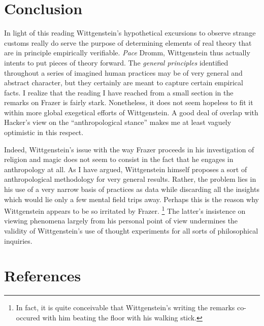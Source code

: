 \documentclass{article}
\begin{document}
\section{Conclusion}
In light of this reading Wittgenstein's hypothetical excursions to observe strange customs really do serve the purpose of determining elements of real theory that are in principle empirically verifiable. \textit{Pace} Dromm, Wittgenstein thus actually intents to put pieces of theory forward. The \textit{general principles} identified throughout a series of imagined human practices may be of very general and abstract character, but they certainly are meant to capture certain empirical facts. I realize that the reading I have reached from a small section in the remarks on Frazer is fairly stark. Nonetheless, it does not seem hopeless to fit it within more global exegetical efforts of Wittgenstein. A good deal of overlap with Hacker's view on the ``anthropological stance'' makes me at least vaguely optimistic in this respect.

Indeed, Wittgenstein's issue with the way Frazer proceeds in his investigation of religion and magic does not seem to consist in the fact that he engages in anthropology at all. As I have argued, Wittgenstein himself proposes a sort of anthropological methodology for very general results. Rather, the problem lies in his use of a very narrow basis of practices as data while discarding all the insights which would lie only a few mental field trips away. Perhaps this is the reason why Wittgenstein appears to be so irritated by Frazer. \footnote{In fact, it is quite conceivable that Wittgenstein's writing the remarks co-occured with him beating the floor with his walking stick.} The latter's insistence on viewing phenomena largely from his personal point of view undermines the validity of Wittgenstein's use of thought experiments for all sorts of philosophical inquiries.

\section{References}
\hypertarget{sec5}{ }
\end{document}
